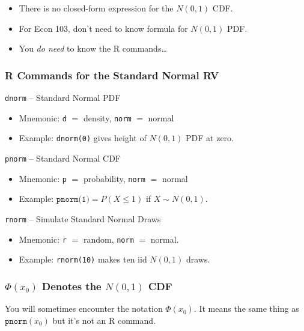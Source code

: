 \documentclass[handout]{beamer}
\begin{document}
\begin{frame}
\begin{figure}[h]
\begin{tabular}{cc}
\end{tabular}
\end{figure}
\begin{itemize}
  \item There is no closed-form expression for the $N(0,1)$ CDF.
  \item For Econ 103, don't need to know formula for $N(0,1)$ PDF.
  \item You \emph{do need} to know the R commands\dots
\end{itemize}
\end{frame}
\begin{frame}
  \frametitle{R Commands for the Standard Normal RV}
  \begin{block}{\texttt{dnorm} -- \small Standard Normal PDF}
    \begin{itemize}
      \item Mnemonic: \texttt{d} $=$ density, \texttt{norm} $=$ normal
      \item Example: \texttt{dnorm(0)} gives height of $N(0,1)$ PDF at zero.
    \end{itemize}
  \end{block}
  \pause
  \begin{block}{\texttt{pnorm} -- \small Standard Normal CDF}
    \begin{itemize}
      \item Mnemonic: \texttt{p} $=$ probability, \texttt{norm} $=$ normal
      \item Example: $\texttt{pnorm(1)} = P(X\leq 1)$ if $X\sim N(0,1)$.
    \end{itemize}
  \end{block}
  \pause
  \begin{block}{\texttt{rnorm} -- \small Simulate Standard Normal Draws}
    \begin{itemize}
      \item Mnemonic: \texttt{r} $=$ random, \texttt{norm} $=$ normal. 
      \item Example: \texttt{rnorm(10)} makes ten iid $N(0,1)$ draws.
    \end{itemize}
  \end{block}
\end{frame}
\begin{frame}
  \frametitle{$\Phi(x_0)$ Denotes the $N(0,1)$ CDF}
  You will sometimes encounter the notation $\Phi(x_0)$.
  It means the same thing as $\texttt{pnorm}(x_0)$ but it's not an R command. 
\end{frame}
\end{document}
